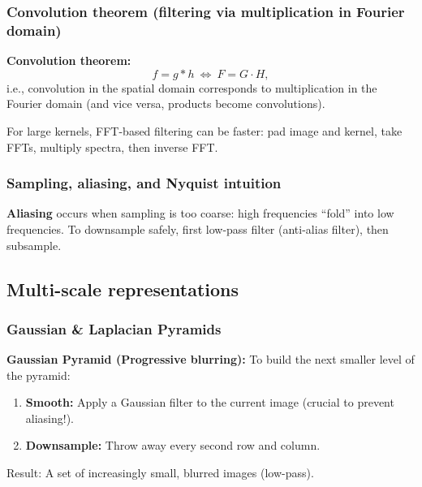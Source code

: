 \documentclass[11pt,a4paper]{article}
\begin{document}
\subsubsection{Convolution theorem (filtering via multiplication in Fourier domain)}

\begin{mathrule}
\textbf{Convolution theorem:}\quad
\[
f = g*h\ \Longleftrightarrow\ F = G\cdot H,
\]
i.e., convolution in the spatial domain corresponds to multiplication in the Fourier domain
(and vice versa, products become convolutions).
\end{mathrule}

\begin{intbox}
For large kernels, FFT-based filtering can be faster:
pad image and kernel, take FFTs, multiply spectra, then inverse FFT.
\end{intbox}


\subsubsection{Sampling, aliasing, and Nyquist intuition}

\begin{defbox}
\textbf{Aliasing} occurs when sampling is too coarse: high frequencies ``fold'' into low frequencies.
To downsample safely, first low-pass filter (anti-alias filter), then subsample.
\end{defbox}


\subsection{Multi-scale representations}
\subsubsection{Gaussian \& Laplacian Pyramids}

\begin{mathrule}
\textbf{Gaussian Pyramid (Progressive blurring):}
To build the next smaller level of the pyramid:
\begin{enumerate}
  \item \textbf{Smooth:} Apply a Gaussian filter to the current image (crucial to prevent aliasing!).
  \item \textbf{Downsample:} Throw away every second row and column.
\end{enumerate}
Result: A set of increasingly small, blurred images (low-pass).
\end{mathrule}
\end{document}
